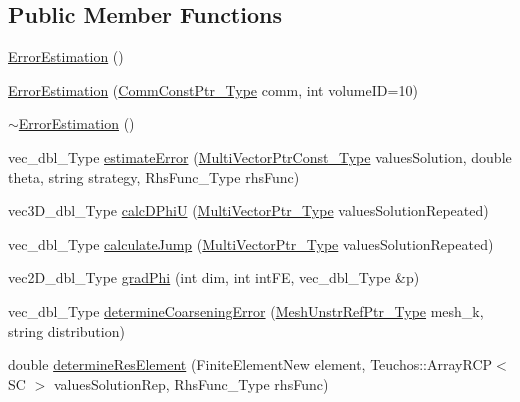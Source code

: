 \subsection*{Public Member Functions}
\begin{DoxyCompactItemize}
\item 
\hyperlink{classFEDD_1_1ErrorEstimation_a0d1a5ec84042b8ff0f7bb1375a4d77bd}{Error\+Estimation} ()
\item 
\hyperlink{classFEDD_1_1ErrorEstimation_a070e1764ce11ff85ddac0b00f2f3c638}{Error\+Estimation} (\hyperlink{classFEDD_1_1ErrorEstimation_a23c88f794d901561ef57840b68c0aa20}{Comm\+Const\+Ptr\+\_\+\+Type} comm, int volume\+ID=10)
\item 
\hyperlink{classFEDD_1_1ErrorEstimation_a98bcec4b2275c1f1a32607f9b427e884}{$\sim$\+Error\+Estimation} ()
\item 
vec\+\_\+dbl\+\_\+\+Type \hyperlink{classFEDD_1_1ErrorEstimation_ad52aca4bc5ce267ce11bda117f218750}{estimate\+Error} (\hyperlink{classFEDD_1_1ErrorEstimation_af61aa23cb14996e497a1176d8fea650d}{Multi\+Vector\+Ptr\+Const\+\_\+\+Type} values\+Solution, double theta, string strategy, Rhs\+Func\+\_\+\+Type rhs\+Func)
\item 
vec3\+D\+\_\+dbl\+\_\+\+Type \hyperlink{classFEDD_1_1ErrorEstimation_a613a42ec996a21f606333d4a504a5ae0}{calc\+D\+PhiU} (\hyperlink{classFEDD_1_1ErrorEstimation_a5882ff373bf8c409b407b4fd1f42bda0}{Multi\+Vector\+Ptr\+\_\+\+Type} values\+Solution\+Repeated)
\item 
vec\+\_\+dbl\+\_\+\+Type \hyperlink{classFEDD_1_1ErrorEstimation_a9b506d6eb6e8c06186a5c3d0e36e92cb}{calculate\+Jump} (\hyperlink{classFEDD_1_1ErrorEstimation_a5882ff373bf8c409b407b4fd1f42bda0}{Multi\+Vector\+Ptr\+\_\+\+Type} values\+Solution\+Repeated)
\item 
vec2\+D\+\_\+dbl\+\_\+\+Type \hyperlink{classFEDD_1_1ErrorEstimation_a74e71e6f93d83fba059694630b01fc49}{grad\+Phi} (int dim, int int\+FE, vec\+\_\+dbl\+\_\+\+Type \&p)
\item 
vec\+\_\+dbl\+\_\+\+Type \hyperlink{classFEDD_1_1ErrorEstimation_a870423d1ecf6258bef063aadde49ac28}{determine\+Coarsening\+Error} (\hyperlink{classFEDD_1_1ErrorEstimation_a541e398a65d9618f8f316a941b57f5cb}{Mesh\+Unstr\+Ref\+Ptr\+\_\+\+Type} mesh\+\_\+k, string distribution)
\item 
double \hyperlink{classFEDD_1_1ErrorEstimation_a95684084f42e2987bb417fc889e4af97}{determine\+Res\+Element} (Finite\+Element\+New element, Teuchos\+::\+Array\+R\+CP$<$ SC $>$ values\+Solution\+Rep, Rhs\+Func\+\_\+\+Type rhs\+Func)

\end{DoxyCompactItemize}
